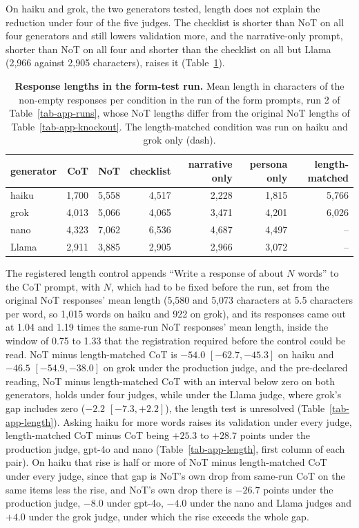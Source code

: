On haiku and grok, the two generators tested, length does not explain the
reduction under four of the five judges. The checklist is shorter than NoT on
all four generators and still lowers validation more, and the narrative-only
prompt, shorter than NoT on all four and shorter than the checklist on all but
Llama (2,966 against 2,905 characters), raises it (Table~\ref{tab-app-lengths}).
\begin{table}[tp]
\centering
\small
\caption{\textbf{Response lengths in the form-test run.}
Mean length in characters of the non-empty responses per condition
in the run of the form prompts, run 2 of Table~\ref{tab-app-runs}, whose NoT lengths differ from
the original NoT lengths of Table~\ref{tab-app-knockout}. The length-matched
condition was run on haiku and grok only (dash).}
\label{tab-app-lengths}
\begin{tabular}{lrrrrrr}
\toprule
generator & CoT & NoT & checklist & narrative only & persona only & length-matched \\
\midrule
haiku & 1{,}700 & 5{,}558 & 4{,}517 & 2{,}228 & 1{,}815 & 5{,}766 \\
grok & 4{,}013 & 5{,}066 & 4{,}065 & 3{,}471 & 4{,}201 & 6{,}026 \\
nano & 4{,}323 & 7{,}062 & 6{,}536 & 4{,}687 & 4{,}497 & -- \\
Llama & 2{,}911 & 3{,}885 & 2{,}905 & 2{,}966 & 3{,}072 & -- \\
\bottomrule
\end{tabular}
\end{table}
The registered length control appends ``Write a response of about $N$
words'' to the CoT prompt, with $N$, which had to be fixed before the run, set
from the original NoT responses' mean length (5,580 and 5,073 characters at 5.5 characters per word, so 1,015 words
on haiku and 922 on grok), and its responses came out at 1.04 and 1.19 times
the same-run NoT responses' mean length, inside the window of 0.75 to 1.33
that the registration required before the control could be read.
NoT minus length-matched CoT is $-54.0$ $[-62.7, -45.3]$ on haiku and $-46.5$
$[-54.9, -38.0]$ on grok under the production judge, and the pre-declared
reading, NoT minus length-matched CoT with an interval below zero on both
generators, holds under four judges, while under the Llama judge, where
grok's gap includes zero ($-2.2$ $[-7.3, +2.2]$), the length test is
unresolved (Table~\ref{tab-app-length}).
Asking haiku for more words raises its validation under every judge,
length-matched CoT minus CoT being $+25.3$ to $+28.7$ points under the
production judge, gpt-4o and nano (Table~\ref{tab-app-length}, first column
of each pair).
On haiku that rise is half or more of NoT minus length-matched CoT under every
judge, since that gap is NoT's own drop from same-run CoT on the same items
less the rise, and NoT's own drop there is $-26.7$ points under the
production judge, $-8.0$ under gpt-4o, $-4.0$ under the nano and Llama judges
and $+4.0$ under the grok judge, under which the rise exceeds the whole gap.

